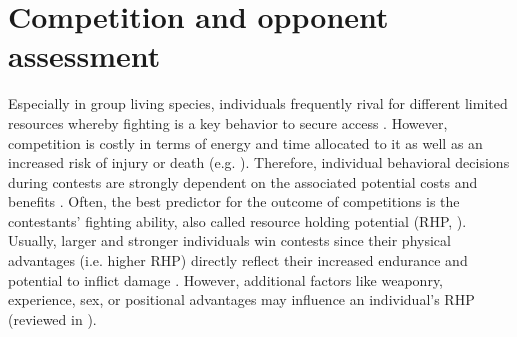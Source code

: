 \documentclass[11pt,pdftex]{article}
\begin{document}
\section{Competition and opponent assessment}

Especially in group living species, individuals frequently rival for different limited resources whereby fighting is a key behavior to secure access \citep{Cluttonbrock1979, Chapman1995, Markham2015}. However, competition is costly in terms of energy and time allocated to it as well as an increased risk of injury or death (e.g. \citealp{Briffa2004}). Therefore, individual behavioral decisions during contests are strongly dependent on the associated potential costs and benefits \citep{ArnottElwood2008, ArnottElwood2009}. Often, the best predictor for the outcome of competitions is the contestants' fighting ability, also called resource holding potential (RHP, \citealp{Parker1974}). Usually, larger and stronger individuals win contests since their physical advantages (i.e. higher RHP) directly reflect their increased endurance and potential to inflict damage \citep{Archer1988}. However, additional factors like weaponry, experience, sex, or positional advantages may influence an individual's RHP (reviewed in \citealp{ArnottElwood2008}). 
\end{document}

